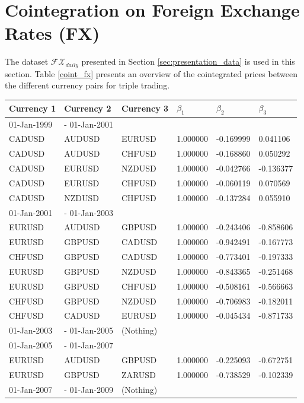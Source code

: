 \documentclass[11pt,a4,twosided,singlespacing,titlepagenumber=on]{scrreprt}
\numberwithin{equation}{chapter} %
\theoremstyle{remark}
\begin{document}
\newpage
\section{Cointegration on Foreign Exchange Rates (FX)}

The dataset $\mathcal{FX}_{daily}$ presented in Section \ref{sec:presentation_data} is used in this section. Table \ref{coint_fx} presents an overview of the cointegrated prices between the different currency pairs for triple trading.

\begin{table}[H]
\centering
\begin{tabular}{llllll}
Currency 1      & Currency 2 & Currency 3 & $\beta_1$ & $\beta_2$ & $\beta_3$ \\ 
\hline
01-Jan-1999 &- 01-Jan-2001 \\
\hline
CADUSD & AUDUSD & EURUSD & 1.000000& -0.169999& 0.041106 \\
CADUSD & AUDUSD & CHFUSD & 1.000000& -0.168860& 0.050292 \\
CADUSD & EURUSD & NZDUSD & 1.000000& -0.042766& -0.136377 \\
CADUSD & EURUSD & CHFUSD & 1.000000& -0.060119& 0.070569 \\
CADUSD & NZDUSD & CHFUSD & 1.000000& -0.137284& 0.055910 \\
\hline
01-Jan-2001 &- 01-Jan-2003 \\
\hline
EURUSD & AUDUSD & GBPUSD & 1.000000& -0.243406& -0.858606 \\
EURUSD & GBPUSD & CADUSD & 1.000000& -0.942491& -0.167773 \\
CHFUSD & GBPUSD & CADUSD & 1.000000& -0.773401& -0.197333 \\
EURUSD & GBPUSD & NZDUSD & 1.000000& -0.843365& -0.251468 \\
EURUSD & GBPUSD & CHFUSD & 1.000000& -0.508161& -0.566663 \\
CHFUSD & GBPUSD & NZDUSD & 1.000000& -0.706983& -0.182011 \\
CHFUSD & CADUSD & EURUSD & 1.000000& -0.045434& -0.871733 \\
\hline
01-Jan-2003 &- 01-Jan-2005 &(Nothing)\\
\hline
01-Jan-2005 &- 01-Jan-2007 \\
\hline
EURUSD & AUDUSD & GBPUSD & 1.000000& -0.225093& -0.672751 \\
EURUSD & GBPUSD & ZARUSD & 1.000000& -0.738529& -0.102339 \\
\hline
01-Jan-2007 &- 01-Jan-2009 &(Nothing)\\

\end{tabular}
\end{table}
\end{document}
